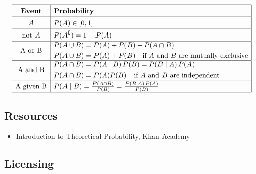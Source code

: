 \[
\renewcommand{\arraystretch}{1.4}
\begin{array}{|c|l|}
\hline
\textbf{Event} & \textbf{Probability} \\ \hline

A & P(A) \in [0,1] \\ \hline

\text{not } A & P(A^{\complement}) = 1 - P(A) \\ \hline

\text{A or B} &
\begin{aligned}
P(A \cup B) &= P(A) + P(B) - P(A \cap B) \\
P(A \cup B) &= P(A) + P(B)
\quad \text{if $A$ and $B$ are mutually exclusive}
\end{aligned}
\\ \hline

\text{A and B} &
\begin{aligned}
P(A \cap B) &= P(A \mid B)\,P(B) = P(B \mid A)\,P(A) \\
P(A \cap B) &= P(A)P(B)
\quad \text{if $A$ and $B$ are independent}
\end{aligned}
\\ \hline

\text{A given B} &
P(A \mid B) = \frac{P(A \cap B)}{P(B)} = \frac{P(B \mid A)\,P(A)}{P(B)}
\\ \hline

\end{array}
\]


\subsection{Resources}
\label{sss:reso-55b5}




\begin{itemize}
    \item \href{https://www.khanacademy.org/math/cc-seventh-grade-math/cc-7th-probability-statistics/cc-7th-basic-prob/v/basic-probability}{Introduction to Theoretical Probability}, Khan Academy
\end{itemize}


\subsection{Licensing}
\label{sss:lice-7352}




